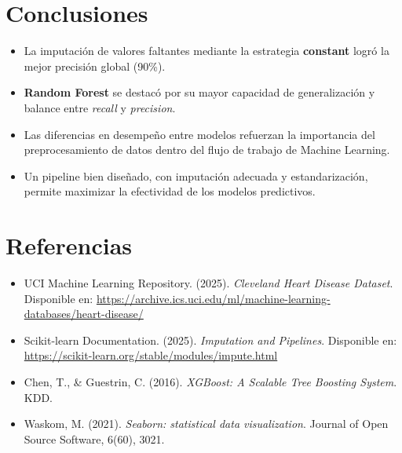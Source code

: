 \documentclass[12pt]{article}
\begin{document}
\section{Conclusiones}
\begin{itemize}
    \item La imputación de valores faltantes mediante la estrategia \textbf{constant} logró la mejor precisión global (90\%).
    \item \textbf{Random Forest} se destacó por su mayor capacidad de generalización y balance entre \textit{recall} y \textit{precision}.
    \item Las diferencias en desempeño entre modelos refuerzan la importancia del preprocesamiento de datos dentro del flujo de trabajo de Machine Learning.
    \item Un pipeline bien diseñado, con imputación adecuada y estandarización, permite maximizar la efectividad de los modelos predictivos.
\end{itemize}

\section{Referencias}
\begin{itemize}
    \item UCI Machine Learning Repository. (2025). \textit{Cleveland Heart Disease Dataset}. Disponible en: \url{https://archive.ics.uci.edu/ml/machine-learning-databases/heart-disease/}
    \item Scikit-learn Documentation. (2025). \textit{Imputation and Pipelines}. Disponible en: \url{https://scikit-learn.org/stable/modules/impute.html}
    \item Chen, T., \& Guestrin, C. (2016). \textit{XGBoost: A Scalable Tree Boosting System}. KDD.
    \item Waskom, M. (2021). \textit{Seaborn: statistical data visualization}. Journal of Open Source Software, 6(60), 3021.
\end{itemize}
\end{document}
